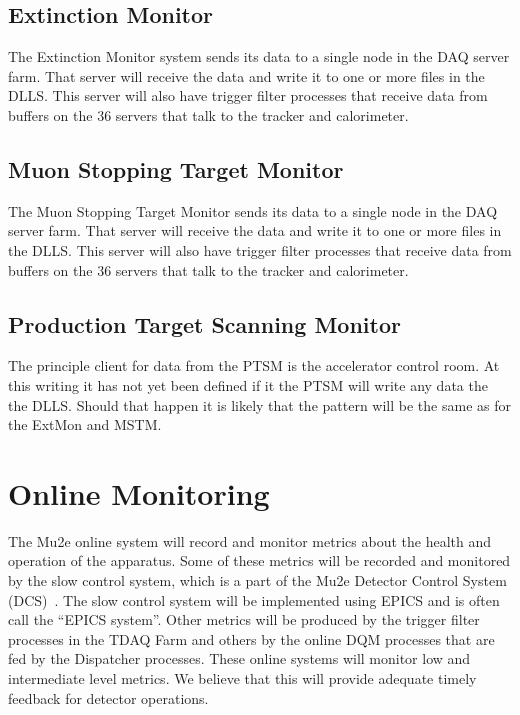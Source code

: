 
\subsection{Extinction Monitor}
\label{ssec:ExtMon}

The Extinction Monitor system sends its data to a single node in the DAQ server farm.
That server will receive the data and write it to one or more files in
the DLLS.  This server will also have trigger filter processes that receive
data from buffers on the 36 servers that talk to the tracker and calorimeter.


\subsection{Muon Stopping Target Monitor}
\label{ssec:MSTM}

The Muon Stopping Target Monitor sends its data to a single node in the DAQ server farm.
That server will receive the data and write it to one or more files in
the DLLS.  This server will also have trigger filter processes that receive
data from buffers on the 36 servers that talk to the tracker and calorimeter.

\subsection{Production Target Scanning Monitor}

The principle client for data from the PTSM is the accelerator control room.
At this writing it has not yet been defined if it the PTSM will write any data the the DLLS.
Should that happen it is likely that the pattern will be the same as for the ExtMon
and MSTM.

\section{Online Monitoring}
\label{sec:onlineMonitoring}

The Mu2e online system will record and monitor metrics about the health and operation of the apparatus.
Some of these metrics will be recorded and monitored by the slow control system,
which is a part	of the Mu2e Detector Control System (DCS)~\cite{DCSSpec}.
The slow control system will be implemented using EPICS and is often call the ``EPICS system''.
Other metrics will be produced by the trigger filter processes in the TDAQ Farm
and others by the online DQM processes that are fed by the Dispatcher processes.
These online systems will monitor low and intermediate level metrics.
We believe that this will provide adequate timely feedback for detector operations.


